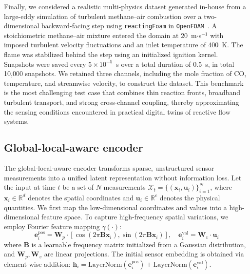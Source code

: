 \documentclass[pdflatex,sn-nature]{sn-jnl}%
\begin{document}
Finally, we considered a realistic multi-physics dataset generated in-house from a large-eddy simulation of turbulent methane--air combustion over a two-dimensional backward-facing step using \texttt{reactingFoam} in \texttt{OpenFOAM}~\cite{Jasak2009OpenFOAM}. 
A stoichiometric methane--air mixture entered the domain at 20~m$\cdot$s$^{-1}$ with imposed turbulent velocity fluctuations and an inlet temperature of 400~K. 
The flame was stabilized behind the step using an initialized ignition kernel. 
Snapshots were saved every $5\times10^{-5}$~s over a total duration of 0.5~s, in total 10,000 snapshots. 
We retained three channels, including the mole fraction of CO, temperature, and streamwise velocity, to construct the dataset. 
This benchmark is the most challenging test case that combines thin reaction fronts, broadband turbulent transport, and strong cross-channel coupling, thereby approximating the sensing conditions encountered in practical digital twins of reactive flow systems.

\subsection*{Global-local-aware encoder}
\label{subsec: encoder}

The global-local-aware encoder transforms sparse, unstructured sensor measurements into a unified latent representation without information loss. 
Let the input at time $t$ be a set of $N$ measurements $\mathcal{X}_t = \{(\mathbf{x}_i, \mathbf{u}_i)\}_{i=1}^N$, where $\mathbf{x}_i \in \mathbb{R}^d$ denotes the spatial coordinates and $\mathbf{u}_i \in \mathbb{R}^c$ denotes the physical quantities.
We first map the low-dimensional coordinates and values into a high-dimensional feature space.
To capture high-frequency spatial variations, we employ Fourier feature mapping $\gamma(\cdot)$:
\begin{equation}
    \mathbf{e}_i^{\text{pos}} = \mathbf{W}_p \cdot [\cos(2\pi \mathbf{B} \mathbf{x}_i), \sin(2\pi \mathbf{B} \mathbf{x}_i)], \quad \mathbf{e}_i^{\text{val}} = \mathbf{W}_v \cdot \mathbf{u}_i
\end{equation}
where $\mathbf{B}$ is a learnable frequency matrix initialized from a Gaussian distribution, and $\mathbf{W}_p, \mathbf{W}_v$ are linear projections. 
The initial sensor embedding is obtained via element-wise addition: $\mathbf{h}_i = \text{LayerNorm}(\mathbf{e}_i^{\text{pos}}) + \text{LayerNorm}(\mathbf{e}_i^{\text{val}})$.
\end{document}
